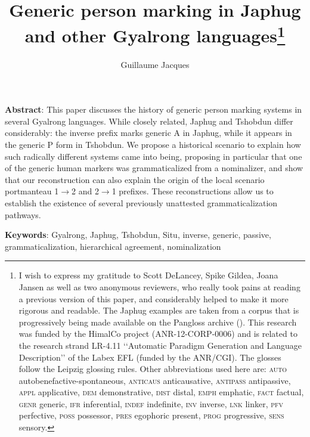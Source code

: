 \documentclass[oneside,a4paper,11pt]{article}
\begin{document}
 
\title{Generic person marking in Japhug and other Gyalrong languages\footnote{I wish to express my gratitude to Scott DeLancey, Spike Gildea, Joana Jansen as well as two anonymous reviewers, who really took pains at reading a previous version of this paper, and considerably helped to make it more rigorous and readable. The Japhug examples are taken from a corpus that is progressively being made available on the Pangloss archive (\citealt{michailovsky14pangloss}).  This research was funded by the HimalCo project (ANR-12-CORP-0006) and is related to the research strand LR-4.11 ‘‘Automatic Paradigm Generation and Language Description’’ of the Labex EFL (funded by the ANR/CGI).  The glosses follow the Leipzig glossing rules. Other abbreviations used here are: \textsc{auto}  autobenefactive-spontaneous, \textsc{anticaus} anticausative, \textsc{antipass} antipassive, \textsc{appl} applicative, \textsc{dem} demonstrative,  \textsc{dist} distal, \textsc{emph} emphatic, \textsc{fact} factual, \textsc{genr} generic, \textsc{ifr} inferential, \textsc{indef} indefinite, \textsc{inv} inverse,  \textsc{lnk} linker, \textsc{pfv} perfective, \textsc{poss} possessor, \textsc{pres} egophoric present, \textsc{prog} progressive, \textsc{sens} sensory.}}
\author{Guillaume Jacques}
\maketitle

\textbf{Abstract}: This paper discusses the history of generic person marking systems in several Gyalrong languages. While closely related,  Japhug and Tshobdun differ considerably: the inverse prefix marks generic A in Japhug, while it appears  in the generic P form in Tshobdun. We propose  a historical scenario to explain how such radically different systems came into being, proposing in particular that one of the generic human markers was grammaticalized from a nominalizer, and show that our reconstruction can also explain the origin of the local scenario portmanteau 1$\rightarrow$2 and  2$\rightarrow$1 prefixes. These reconstructions allow us to establish the existence of several previously unattested grammaticalization pathways.

\textbf{Keywords}: Gyalrong, Japhug, Tshobdun, Situ, inverse, generic, passive, grammaticalization, hierarchical agreement, nominalization
 
 
\end{document}

